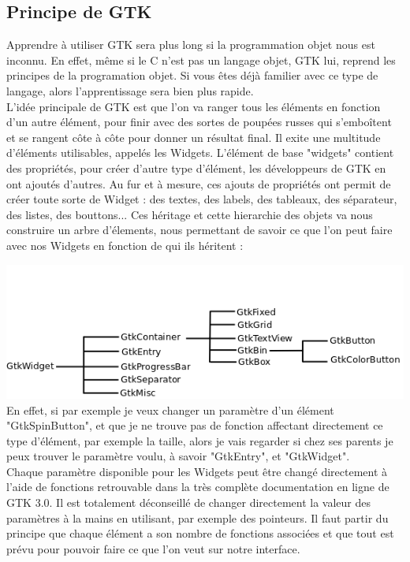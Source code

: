 \documentclass[11pt,french,a4paper]{report}
\begin{document}
        \subsection{Principe de GTK}
Apprendre à utiliser GTK sera plus long si la programmation objet nous est inconnu. En effet, même si le C n'est pas un langage objet,
GTK lui, reprend les principes de la programation objet. Si vous êtes déjà familier avec ce type de langage, alors l'apprentissage
sera bien plus rapide.\\
L'idée principale de GTK est que l'on va ranger tous les éléments en fonction d'un autre élément, pour finir avec des sortes de poupées 
russes qui s'emboîtent et se rangent côte à côte pour donner un résultat final. Il exite une multitude d'éléments utilisables, 
appelés les Widgets. L'élément de base "widgets" contient des propriétés, pour créer d'autre type d'élément, les développeurs de GTK 
en ont ajoutés d'autres. 
Au fur et à mesure, ces ajouts de propriétés ont permit de créer toute sorte de Widget : des textes, des labels, des tableaux, 
des séparateur, des listes, des bouttons... 
Ces héritage et cette hierarchie des objets va nous construire un arbre d'élements, nous permettant de savoir ce que l'on peut 
faire avec nos Widgets en fonction de qui ils héritent : 

\includegraphics[scale=0.7]{../images/dia/arbo_widget.png} \\


En effet, si par exemple je veux changer un paramètre d'un élément "GtkSpinButton", et que je ne trouve pas de fonction 
affectant directement ce type d'élément, par exemple la taille, alors je vais regarder si chez ses parents je peux trouver 
le paramètre voulu, à savoir "GtkEntry", et "GtkWidget". \\

Chaque paramètre disponible pour les Widgets peut être changé directement à l'aide de fonctions retrouvable dans la très complète 
documentation en ligne de GTK 3.0. Il est totalement déconseillé de changer directement la valeur des paramètres à la mains 
en utilisant, par exemple des pointeurs. Il faut partir du principe que chaque élément a son nombre de fonctions associées 
et que tout est prévu pour pouvoir faire ce que l'on veut sur notre interface. \\ 
\\
\end{document}
